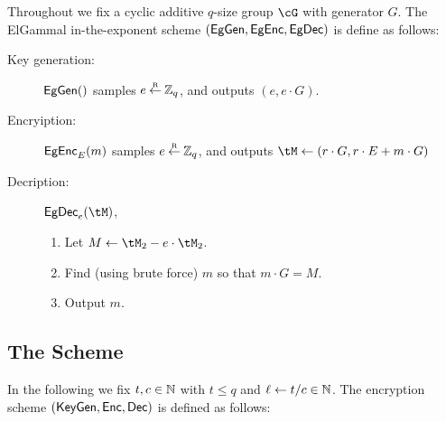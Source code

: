 Throughout we fix a cyclic  additive $q$-size group $\cG$ with generator $G$. The  ElGammal in-the-exponent scheme $(\mathsf{EgGen},\mathsf{EgEnc},\mathsf{EgDec})$ is define as follows:
\begin{description}
	\item[Key generation:] $\mathsf{EgGen}()$ samples $e\mathbin{\stackrel{\mbox{\tiny R}}{\leftarrow}} {\mathbb Z}_q$, and outputs $(e,e\cdot G)$.
	
	\item[Encryiption:] $\mathsf{EgEnc}_E(m)$  samples $e\mathbin{\stackrel{\mbox{\tiny R}}{\leftarrow}} {\mathbb Z}_q$, and outputs  $\tM \asn (r\cdot G, r\cdot E + m \cdot G)$
	
	
		\item[Decription:] $\EgDec_e(\tM)$,   
		\begin{enumerate}
			\item 	Let $M \asn \tM_2 - e\cdot \tM_2$.
			
			\item Find (using brute force) $m$ so that $m\cdot G = M$.
			
			\item Output $m$.
		\end{enumerate}
	\end{description}
	
	
\subsection{The Scheme}\label{sec:ChanksEG:EGScheme}
In the following we fix $t,c\in {\mathbb{N}}$ with $t\le q$ and $\ell \leftarrow t/c \in {\mathbb{N}}$. The encryption scheme $(\mathsf{KeyGen},\mathsf{Enc},\mathsf{Dec})$ is defined as follows:

